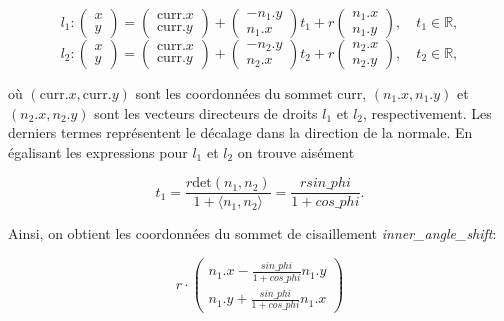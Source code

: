 \documentclass[12pt]{article}
\begin{document}
\begin{enumerate}
		\begin{equation*}
		l_1: 
		\begin{pmatrix}
		x\\
		y
		\end{pmatrix} =
		\begin{pmatrix}
		\textrm{curr}.x\\
		\textrm{curr}.y
		\end{pmatrix} +
		\begin{pmatrix}
		-n_1.y\\
		n_1.x
		\end{pmatrix}t_1 + r
		\begin{pmatrix}
		n_1.x\\
		n_1.y
		\end{pmatrix}, \quad t_1 \in \mathbb{R},
		\end{equation*}
		\begin{equation*}
		l_2: 
		\begin{pmatrix}
		x\\
		y
		\end{pmatrix} =
		\begin{pmatrix}
		\textrm{curr}.x\\
		\textrm{curr}.y
		\end{pmatrix} +
		\begin{pmatrix}
		-n_2.y\\
		n_2.x
		\end{pmatrix}t_2 + r
		\begin{pmatrix}
		n_2.x\\
		n_2.y
		\end{pmatrix}, \quad t_2 \in \mathbb{R},
		\end{equation*}
		
		où $(\textrm{curr}.x, \textrm{curr}.y)$ sont les coordonnées du sommet curr, $(n_1.x, n_1.y)$ et $(n_2.x, n_2.y)$ sont les vecteurs directeurs de droits $l_1$ et $l_2$, respectivement. Les derniers termes représentent le décalage dans la direction de la normale. En égalisant les expressions pour $l_1$ et $l_2$ on trouve aisément
		
		\begin{displaymath}
		t_1 = \dfrac{r\textrm{det}(n_1,n_2)}{1+\langle n_1,n_2\rangle} =  \dfrac{r sin\_phi}{1+cos\_phi}.
		\end{displaymath}
		
		Ainsi, on obtient les coordonnées du sommet de cisaillement \textit{inner\_angle\_shift}:
		
		\begin{displaymath}
		r\cdot\begin{pmatrix}
		n_1.x - \frac{sin\_phi}{1+cos\_phi}n_1.y\\
		n_1.y + \frac{sin\_phi}{1+cos\_phi}n_1.x
		\end{pmatrix} 
		\end{displaymath}
		

\end{enumerate}
\end{document}
